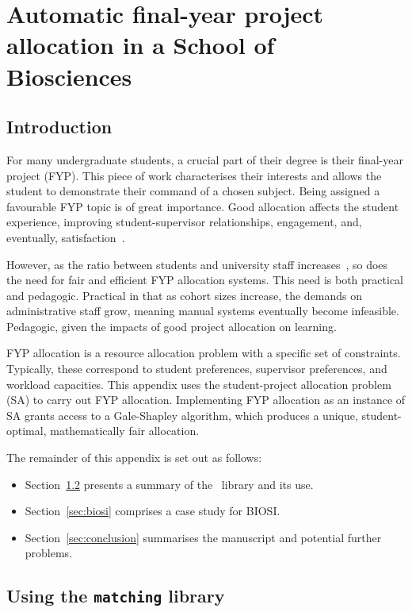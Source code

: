 \chapter{Automatic final-year project allocation in a School of Biosciences}
\label{app:biosci}

\section{Introduction}

For many undergraduate students, a crucial part of their degree is their
final-year project (FYP). This piece of work characterises their interests and
allows the student to demonstrate their command of a chosen subject. Being
assigned a favourable FYP topic is of great importance. Good allocation affects
the student experience, improving student-supervisor relationships, engagement,
and, eventually, satisfaction~\cite{Briffa2018,Kuh2009}.

However, as the ratio between students and university staff
increases~\cite{McDonald2013}, so does the need for fair and efficient FYP
allocation systems. This need is both practical and pedagogic. Practical in that
as cohort sizes increase, the demands on administrative staff grow, meaning
manual systems eventually become infeasible. Pedagogic, given the impacts of
good project allocation on learning.

FYP allocation is a resource allocation problem with a specific set of
constraints. Typically, these correspond to student preferences, supervisor
preferences, and workload capacities. This appendix uses the student-project
allocation problem (SA) to carry out FYP allocation. Implementing FYP allocation as
an instance of SA grants access to a Gale-Shapley algorithm, which produces a
unique, student-optimal, mathematically fair allocation.

The remainder of this appendix is set out as follows:

\begin{itemize}
    \item Section~\ref{sec:matching} presents a summary of the \matching\
        library and its use.
    \item Section~\ref{sec:biosi} comprises a case study for BIOSI.
    \item Section~\ref{sec:conclusion} summarises the manuscript and potential
        further problems.
\end{itemize}


\section{Using the {\color{grey}\texttt{matching}} library}
\label{sec:matching}



